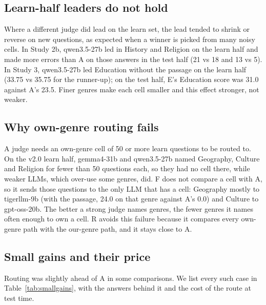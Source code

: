 \documentclass[11pt]{article}
\begin{document}
\subsection{Learn-half leaders do not hold}

Where a different judge did lead on the learn set, the lead tended to shrink or reverse on new questions, as expected
when a winner is picked from many noisy cells. In Study 2b, qwen3.5-27b led in History and Religion on the learn half
and made more errors than A on those answers in the test half (21 vs 18 and 13 vs 5). In Study 3, qwen3.5-27b led
Education without the passage on the learn half (33.75 vs 35.75 for the runner-up); on the test half, E's Education
score was 31.0 against A's 23.5. Finer genres make each cell smaller and this effect stronger, not weaker.

\subsection{Why own-genre routing fails}\label{sec:whyf}

A judge needs an own-genre cell of 50 or more learn questions to be routed to. On the v2.0 learn half, gemma4-31b and
qwen3.5-27b named Geography, Culture and Religion for fewer than 50 questions each, so they had no cell there, while
weaker LLMs, which over-use some genres, did. F does not compare a cell with A, so it sends those questions to the only
LLM that has a cell: Geography mostly to tigerllm-9b (with the passage, 24.0 on that genre against A's 0.0) and
Culture to gpt-oss-20b. The better a strong judge names genres, the fewer genres it names often enough to own a cell.
R avoids this failure because it compares every own-genre path with the our-genre path, and it stays close to A.

\subsection{Small gains and their price}\label{sec:cost}

Routing was slightly ahead of A in some comparisons. We list every such case in Table~\ref{tab:smallgains}, with the
answers behind it and the cost of the route at test time.
\end{document}
